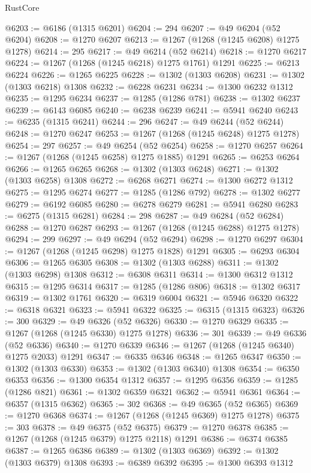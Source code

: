\begin{lexlean}{RustCore}
\begin{coremodule}
@6203 := @6186 (@1315 @6201)
@6204 := 294
@6207 := @49 @6204 (@52 @6204)
@6208 := @1270 @6207
@6213 := @1267 (@1268 (@1245 @6208) @1275 @1278)
@6214 := 295
@6217 := @49 @6214 (@52 @6214)
@6218 := @1270 @6217
@6224 := @1267 (@1268 (@1245 @6218) @1275 @1761) @1291
@6225 := @6213 @6224
@6226 := @1265 @6225
@6228 := @1302 (@1303 @6208)
@6231 := @1302 (@1303 @6218) @1308
@6232 := @6228 @6231
@6234 := @1300 @6232 @1312
@6235 := @1295 @6234
@6237 := @1285 (@1286 @781)
@6238 := @1302 @6237
@6239 := @6143 @6085
@6240 := @6238 @6239
@6241 := @5941 @6240
@6243 := @6235 (@1315 @6241)
@6244 := 296
@6247 := @49 @6244 (@52 @6244)
@6248 := @1270 @6247
@6253 := @1267 (@1268 (@1245 @6248) @1275 @1278)
@6254 := 297
@6257 := @49 @6254 (@52 @6254)
@6258 := @1270 @6257
@6264 := @1267 (@1268 (@1245 @6258) @1275 @1885) @1291
@6265 := @6253 @6264
@6266 := @1265 @6265
@6268 := @1302 (@1303 @6248)
@6271 := @1302 (@1303 @6258) @1308
@6272 := @6268 @6271
@6274 := @1300 @6272 @1312
@6275 := @1295 @6274
@6277 := @1285 (@1286 @792)
@6278 := @1302 @6277
@6279 := @6192 @6085
@6280 := @6278 @6279
@6281 := @5941 @6280
@6283 := @6275 (@1315 @6281)
@6284 := 298
@6287 := @49 @6284 (@52 @6284)
@6288 := @1270 @6287
@6293 := @1267 (@1268 (@1245 @6288) @1275 @1278)
@6294 := 299
@6297 := @49 @6294 (@52 @6294)
@6298 := @1270 @6297
@6304 := @1267 (@1268 (@1245 @6298) @1275 @1828) @1291
@6305 := @6293 @6304
@6306 := @1265 @6305
@6308 := @1302 (@1303 @6288)
@6311 := @1302 (@1303 @6298) @1308
@6312 := @6308 @6311
@6314 := @1300 @6312 @1312
@6315 := @1295 @6314
@6317 := @1285 (@1286 @806)
@6318 := @1302 @6317
@6319 := @1302 @1761
@6320 := @6319 @6004
@6321 := @5946 @6320
@6322 := @6318 @6321
@6323 := @5941 @6322
@6325 := @6315 (@1315 @6323)
@6326 := 300
@6329 := @49 @6326 (@52 @6326)
@6330 := @1270 @6329
@6335 := @1267 (@1268 (@1245 @6330) @1275 @1278)
@6336 := 301
@6339 := @49 @6336 (@52 @6336)
@6340 := @1270 @6339
@6346 := @1267 (@1268 (@1245 @6340) @1275 @2033) @1291
@6347 := @6335 @6346
@6348 := @1265 @6347
@6350 := @1302 (@1303 @6330)
@6353 := @1302 (@1303 @6340) @1308
@6354 := @6350 @6353
@6356 := @1300 @6354 @1312
@6357 := @1295 @6356
@6359 := @1285 (@1286 @821)
@6361 := @1302 @6359 @6321
@6362 := @5941 @6361
@6364 := @6357 (@1315 @6362)
@6365 := 302
@6368 := @49 @6365 (@52 @6365)
@6369 := @1270 @6368
@6374 := @1267 (@1268 (@1245 @6369) @1275 @1278)
@6375 := 303
@6378 := @49 @6375 (@52 @6375)
@6379 := @1270 @6378
@6385 := @1267 (@1268 (@1245 @6379) @1275 @2118) @1291
@6386 := @6374 @6385
@6387 := @1265 @6386
@6389 := @1302 (@1303 @6369)
@6392 := @1302 (@1303 @6379) @1308
@6393 := @6389 @6392
@6395 := @1300 @6393 @1312

\end{coremodule}
\end{lexlean}
